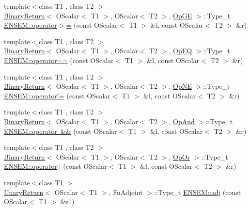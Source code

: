 \begin{DoxyCompactItemize}
\item 
{\footnotesize template$<$class T1 , class T2 $>$ }\\\mbox{\hyperlink{structBinaryReturn}{Binary\+Return}}$<$ O\+Scalar$<$ T1 $>$, O\+Scalar$<$ T2 $>$, \mbox{\hyperlink{structOpGE}{Op\+GE}} $>$\+::Type\+\_\+t \mbox{\hyperlink{group__obsscalar_ga662fdae406fd639518843fb671368f0d}{E\+N\+S\+E\+M\+::operator$>$=}} (const O\+Scalar$<$ T1 $>$ \&l, const O\+Scalar$<$ T2 $>$ \&r)
\item 
{\footnotesize template$<$class T1 , class T2 $>$ }\\\mbox{\hyperlink{structBinaryReturn}{Binary\+Return}}$<$ O\+Scalar$<$ T1 $>$, O\+Scalar$<$ T2 $>$, \mbox{\hyperlink{structOpEQ}{Op\+EQ}} $>$\+::Type\+\_\+t \mbox{\hyperlink{group__obsscalar_ga95c536ecc3b51c1ac09a016d357d7237}{E\+N\+S\+E\+M\+::operator==}} (const O\+Scalar$<$ T1 $>$ \&l, const O\+Scalar$<$ T2 $>$ \&r)
\item 
{\footnotesize template$<$class T1 , class T2 $>$ }\\\mbox{\hyperlink{structBinaryReturn}{Binary\+Return}}$<$ O\+Scalar$<$ T1 $>$, O\+Scalar$<$ T2 $>$, \mbox{\hyperlink{structOpNE}{Op\+NE}} $>$\+::Type\+\_\+t \mbox{\hyperlink{group__obsscalar_ga0dc8425f7eb49097253c996107d2ff8e}{E\+N\+S\+E\+M\+::operator!=}} (const O\+Scalar$<$ T1 $>$ \&l, const O\+Scalar$<$ T2 $>$ \&r)
\item 
{\footnotesize template$<$class T1 , class T2 $>$ }\\\mbox{\hyperlink{structBinaryReturn}{Binary\+Return}}$<$ O\+Scalar$<$ T1 $>$, O\+Scalar$<$ T2 $>$, \mbox{\hyperlink{structOpAnd}{Op\+And}} $>$\+::Type\+\_\+t \mbox{\hyperlink{group__obsscalar_ga7e3b0e4d68793d07ed6616df54117609}{E\+N\+S\+E\+M\+::operator \&\&}} (const O\+Scalar$<$ T1 $>$ \&l, const O\+Scalar$<$ T2 $>$ \&r)
\item 
{\footnotesize template$<$class T1 , class T2 $>$ }\\\mbox{\hyperlink{structBinaryReturn}{Binary\+Return}}$<$ O\+Scalar$<$ T1 $>$, O\+Scalar$<$ T2 $>$, \mbox{\hyperlink{structOpOr}{Op\+Or}} $>$\+::Type\+\_\+t \mbox{\hyperlink{group__obsscalar_gae6474aecd45d7fea902ccc4db61bfaaa}{E\+N\+S\+E\+M\+::operator$\vert$$\vert$}} (const O\+Scalar$<$ T1 $>$ \&l, const O\+Scalar$<$ T2 $>$ \&r)
\item 
{\footnotesize template$<$class T1 $>$ }\\\mbox{\hyperlink{structUnaryReturn}{Unary\+Return}}$<$ O\+Scalar$<$ T1 $>$, Fn\+Adjoint $>$\+::Type\+\_\+t \mbox{\hyperlink{group__obsscalar_ga08302e6d2883f4f095a5e579bce6b2b8}{E\+N\+S\+E\+M\+::adj}} (const O\+Scalar$<$ T1 $>$ \&s1)

\end{DoxyCompactItemize}
